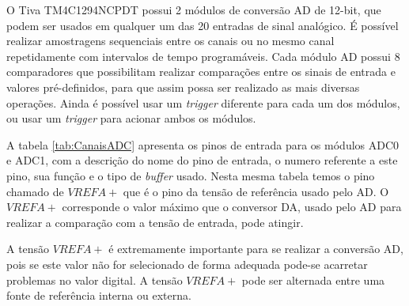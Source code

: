 O Tiva TM4C1294NCPDT possui 2 módulos de conversão AD  de 12-bit, que podem ser usados em qualquer um das 20 entradas de sinal analógico. É possível realizar amostragens sequenciais entre os canais ou no mesmo canal repetidamente com intervalos de tempo  programáveis. Cada módulo AD possui 8 comparadores que possibilitam realizar comparações entre os sinais de entrada e  valores pré-definidos, para que assim possa ser realizado as mais diversas operações.  Ainda é possível usar um \emph{trigger} diferente para cada um dos módulos, ou usar um \emph{trigger} para acionar ambos os módulos.

A tabela \ref{tab:CanaisADC} apresenta os pinos de entrada para os módulos ADC0 e ADC1, com a descrição do nome do pino de entrada, o numero referente a este pino, sua função e o tipo de \emph{buffer} usado. Nesta mesma tabela temos o  pino chamado de $VREFA+$ que é o pino da tensão de referência usado pelo AD. O $VREFA+$ corresponde o valor máximo que o conversor DA, usado pelo AD para realizar a comparação com a tensão de entrada, pode atingir. 

A tensão $VREFA+$ é extremamente importante para se realizar a conversão AD, pois se este valor não for selecionado de forma adequada pode-se acarretar problemas no valor digital. A tensão $VREFA+$ pode ser alternada entre uma fonte de referência interna ou externa. 

